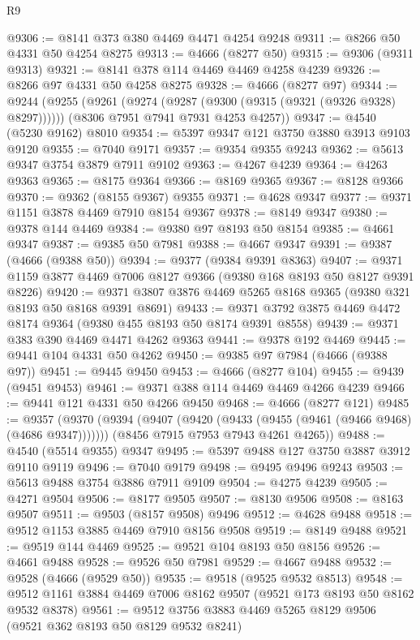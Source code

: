 \begin{lexlean}{R9}
\begin{coremodule}
@9306 := @8141 @373 @380 @4469 @4471 @4254 @9248
@9311 := @8266 @50 @4331 @50 @4254 @8275
@9313 := @4666 (@8277 @50)
@9315 := @9306 (@9311 @9313)
@9321 := @8141 @378 @114 @4469 @4469 @4258 @4239
@9326 := @8266 @97 @4331 @50 @4258 @8275
@9328 := @4666 (@8277 @97)
@9344 := @9244
    (@9255
      (@9261 (@9274 (@9287 (@9300 (@9315 (@9321 (@9326 @9328) @8297))))))
      (@8306 @7951 @7941 @7931 @4253 @4257))
@9347 := @4540 (@5230 @9162) @8010
@9354 := @5397 @9347 @121 @3750 @3880 @3913 @9103 @9120
@9355 := @7040 @9171
@9357 := @9354 @9355 @9243
@9362 := @5613 @9347 @3754 @3879 @7911 @9102
@9363 := @4267 @4239
@9364 := @4263 @9363
@9365 := @8175 @9364
@9366 := @8169 @9365
@9367 := @8128 @9366
@9370 := @9362 (@8155 @9367) @9355
@9371 := @4628 @9347
@9377 := @9371 @1151 @3878 @4469 @7910 @8154 @9367
@9378 := @8149 @9347
@9380 := @9378 @144 @4469
@9384 := @9380 @97 @8193 @50 @8154
@9385 := @4661 @9347
@9387 := @9385 @50 @7981
@9388 := @4667 @9347
@9391 := @9387 (@4666 (@9388 @50))
@9394 := @9377 (@9384 @9391 @8363)
@9407 := @9371 @1159 @3877 @4469 @7006 @8127 @9366 (@9380 @168 @8193 @50 @8127 @9391 @8226)
@9420 := @9371 @3807 @3876 @4469 @5265 @8168 @9365 (@9380 @321 @8193 @50 @8168 @9391 @8691)
@9433 := @9371 @3792 @3875 @4469 @4472 @8174 @9364 (@9380 @455 @8193 @50 @8174 @9391 @8558)
@9439 := @9371 @383 @390 @4469 @4471 @4262 @9363
@9441 := @9378 @192 @4469
@9445 := @9441 @104 @4331 @50 @4262
@9450 := @9385 @97 @7984 (@4666 (@9388 @97))
@9451 := @9445 @9450
@9453 := @4666 (@8277 @104)
@9455 := @9439 (@9451 @9453)
@9461 := @9371 @388 @114 @4469 @4469 @4266 @4239
@9466 := @9441 @121 @4331 @50 @4266 @9450
@9468 := @4666 (@8277 @121)
@9485 := @9357
    (@9370
      (@9394 (@9407 (@9420 (@9433 (@9455 (@9461 (@9466 @9468) (@4686 @9347)))))))
      (@8456 @7915 @7953 @7943 @4261 @4265))
@9488 := @4540 (@5514 @9355) @9347
@9495 := @5397 @9488 @127 @3750 @3887 @3912 @9110 @9119
@9496 := @7040 @9179
@9498 := @9495 @9496 @9243
@9503 := @5613 @9488 @3754 @3886 @7911 @9109
@9504 := @4275 @4239
@9505 := @4271 @9504
@9506 := @8177 @9505
@9507 := @8130 @9506
@9508 := @8163 @9507
@9511 := @9503 (@8157 @9508) @9496
@9512 := @4628 @9488
@9518 := @9512 @1153 @3885 @4469 @7910 @8156 @9508
@9519 := @8149 @9488
@9521 := @9519 @144 @4469
@9525 := @9521 @104 @8193 @50 @8156
@9526 := @4661 @9488
@9528 := @9526 @50 @7981
@9529 := @4667 @9488
@9532 := @9528 (@4666 (@9529 @50))
@9535 := @9518 (@9525 @9532 @8513)
@9548 := @9512 @1161 @3884 @4469 @7006 @8162 @9507 (@9521 @173 @8193 @50 @8162 @9532 @8378)
@9561 := @9512 @3756 @3883 @4469 @5265 @8129 @9506 (@9521 @362 @8193 @50 @8129 @9532 @8241)

\end{coremodule}
\end{lexlean}
